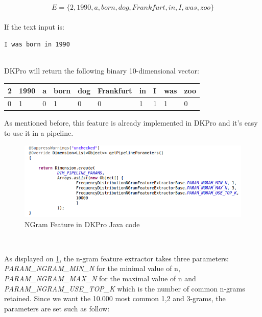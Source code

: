 \begin{equation*}
E = \{2, 1990, a, born, dog, Frankfurt, in, I, was, zoo\}
\end{equation*}
\\

If the text input is:
\\
\centerline{\texttt{I was born in 1990}}
\\

DKPro will return the following binary 10-dimensional vector:
\begin{table}[h]
\center
\begin{tabular}{llllllllll}
2                       & 1990                   & a                      & born                   & dog                    & Frankfurt              & in                     & I                      & was                    & zoo                    \\ \hline
\multicolumn{1}{|l|}{0} & \multicolumn{1}{l|}{1} & \multicolumn{1}{l|}{0} & \multicolumn{1}{l|}{1} & \multicolumn{1}{l|}{0} & \multicolumn{1}{l|}{0} & \multicolumn{1}{l|}{1} & \multicolumn{1}{l|}{1} & \multicolumn{1}{l|}{1} & \multicolumn{1}{l|}{0} \\ \hline
\end{tabular}
\end{table}

As mentioned before, this feature is already implemented in DKPro and it's easy to use it in a pipeline.
\
\begin{figure}[h]
    \centering
    \includegraphics[width=1.05\textwidth]{fig/ngramfeature.png}
    \caption[Short caption]{NGram Feature in DKPro Java code}
    \label{fig:ngramfeature}
\end{figure}
\

As displayed on \ref{fig:ngramfeature}, the n-gram feature extractor takes three parameters: \emph{PARAM\_NGRAM\_MIN\_N} for the minimal value of n, \emph{PARAM\_NGRAM\_MAX\_N} for the maximal value of n and \emph{PARAM\_NGRAM\_USE\_TOP\_K} which is the number of common n-grams retained.
Since we want the 10.000 most common 1,2 and 3-grams, the parameters are set such as follow:

